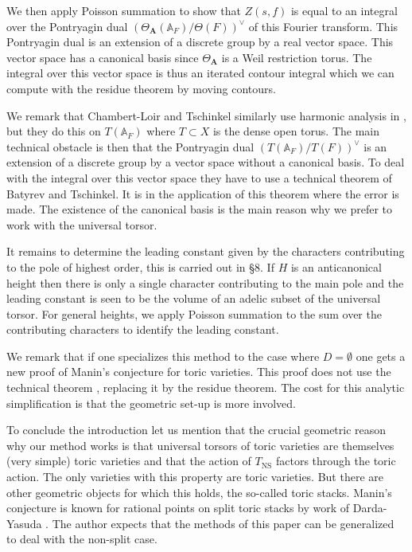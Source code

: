 \documentclass[a4paper,11pt,reqno]{amsart}
\newcommand{\A}{\mathbb{A}}
\DeclareMathOperator{\NS}{NS}
\theoremstyle{definition}
\begin{document}
We then apply Poisson summation to show that $Z(s, f)$ is equal to an integral over the Pontryagin dual $(\Theta_{\mathbf{A}}(\A_F)/\Theta(F))^{\vee}$ of this Fourier transform. This Pontryagin dual is an extension of a discrete group by a real vector space. This vector space has a canonical basis since $\Theta_{\mathbf{A}}$ is a Weil restriction torus. The integral over this vector space is thus an iterated contour integral which we can compute with the residue theorem by moving contours.

We remark that Chambert-Loir and Tschinkel similarly use harmonic analysis in \cite{Chambert-Loir2010Integral}, but they do this on $T(\A_F)$ where $T \subset X$ is the dense open torus. The main technical obstacle is then that the Pontryagin dual $(T(\A_F)/T(F))^{\vee}$ is an extension of a discrete group by a vector space without a canonical basis. To deal with the integral over this vector space they have to use a technical theorem \cite[Thm.~6.17]{Batyrev1998Manin} of Batyrev and Tschinkel. It is in the application of this theorem where the error is made. The existence of the canonical basis is the main reason why we prefer to work with the universal torsor.

It remains to determine the leading constant given by the characters contributing to the pole of highest order, this is carried out in \S 8. If $H$ is an anticanonical height then there is only a single character contributing to the main pole and the leading constant is seen to be the volume of an adelic subset of the universal torsor. For general heights, we apply Poisson summation to the sum over the contributing characters to identify the leading constant.

We remark that if one specializes this method to the case where $D = \emptyset$ one gets a new proof of Manin's conjecture for toric varieties. This proof does not use the technical theorem \cite[Thm.~6.17]{Batyrev1998Manin}, replacing it by the residue theorem. The cost for this analytic simplification is that the geometric set-up is more involved.

To conclude the introduction let us mention that the crucial geometric reason why our method works is that universal torsors of toric varieties are themselves (very simple) toric varieties and that the action of $T_{\NS}$ factors through the toric action. The only varieties with this property are toric varieties. But there are other geometric objects for which this holds, the so-called toric stacks. Manin's conjecture is known for rational points on split toric stacks by work of Darda-Yasuda \cite{Darda2023Toric}. The author expects that the methods of this paper can be generalized to deal with the non-split case. 
\end{document}
